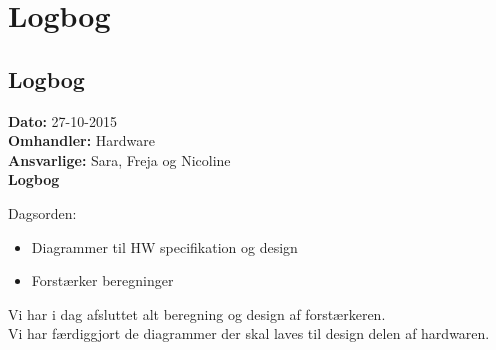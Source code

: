 \chapter{Logbog}
\section{Logbog}

\textbf{Dato:} 27-10-2015 \\
\textbf{Omhandler:} Hardware \\
\textbf{Ansvarlige:} Sara, Freja og Nicoline \\
\textbf{Logbog}

Dagsorden:
\begin{itemize}
	\item Diagrammer til HW specifikation og design
	\item Forstærker beregninger
\end{itemize}

Vi har i dag afsluttet alt beregning og design af forstærkeren.\\
Vi har færdiggjort de diagrammer der skal laves til design delen af hardwaren.\\
   
